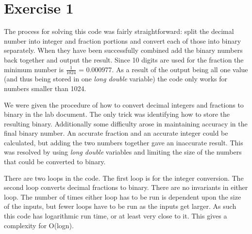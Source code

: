\documentclass{article}
\begin{document}
\section{Exercise 1}
The process for solving this code was fairly straightforward: split the decimal number into integer and fraction portions and convert each of those into binary separately. When they have been successfully combined add the binary numbers back together and output the result. Since 10 digits are used for the fraction the minimum number is $\frac{1}{1024}$ = 0.000977. As a result of the output being all one value (and thus being stored in one \textit{long double} variable) the code only works for numbers smaller than 1024.

We were given the procedure of how to convert decimal integers and fractions to binary in the lab document. The only trick was identifying how to store the resulting binary. Additionally some difficulty arose in maintaining accuracy in the final binary number. An accurate fraction and an accurate integer could be calculated, but adding the two numbers together gave an inaccurate result. This was resolved by using \textit{long double} variables and limiting the size of the numbers that could be converted to binary.

There are two loops in the code. The first loop is for the integer conversion. The second loop converts decimal fractions to binary. There are no invariants in either loop. The number of times either loop has to be run is dependent upon the size of the inputs, but fewer loops have to be run as the inputs get larger. As such this code has logarithmic run time, or at least very close to it. This gives a complexity for O(logn).
\end{document}
